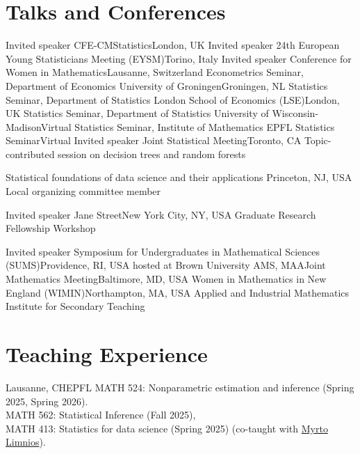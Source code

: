 \documentclass[10pt,a4paper,roman]{moderncv}        %
\begin{document}
\vspace{-0.3cm}
\section{Talks and Conferences}
{Invited speaker}
{CFE-CMStatistics}{London, UK}
{}
{}
{Invited speaker}
{24th European Young Statisticians Meeting (EYSM)}{Torino, Italy}
{}
{}
{Invited speaker}
{Conference for Women in Mathematics}{Lausanne, Switzerland}
{}
{}
{Econometrics Seminar, Department of Economics}
{University of Groningen}{Groningen, NL}
{}
{}
{Statistics Seminar, Department of Statistics}
{London School of Economics (LSE)}{London, UK}
{}
{}
{Statistics Seminar, Department of Statistics}
{University of Wisconsin-Madison}{Virtual}
{}
{}
{Statistics Seminar, Institute of Mathematics}
{EPFL Statistics Seminar}{Virtual}
{}
{}
{Invited speaker}
{Joint Statistical Meeting}{Toronto, CA}
{Topic-contributed session on decision trees and random forests}
{}

{Statistical foundations of data science and their applications}
{Princeton, NJ, USA}
{}{Local organizing committee member}

{Invited speaker}
{Jane Street}{New York City, NY, USA}
{Graduate Research Fellowship Workshop}
{}

{Invited speaker}
{Symposium for Undergraduates in Mathematical Sciences (SUMS)}{Providence, RI, USA}
{hosted at Brown University}
{}
{AMS, MAA}{Joint Mathematics Meeting}{Baltimore, MD, USA}
{}{}
{Women in Mathematics in New England (WIMIN)}{Northampton, MA, USA}
{}{}
{Applied and Industrial Mathematics Institute for Secondary Teaching}
{}


\vspace{-0.3cm}
\section{Teaching Experience}
{Lausanne, CH}{EPFL}{
MATH 524: Nonparametric estimation and inference (Spring 2025, Spring 2026).\\
MATH 562: Statistical Inference (Fall 2025),\\
MATH 413: Statistics for data science (Spring 2025) (co-taught with \color{blue}\href{https://myrtolimnios.github.io}{Myrto Limnios}\color{black}).
}
\end{document}
